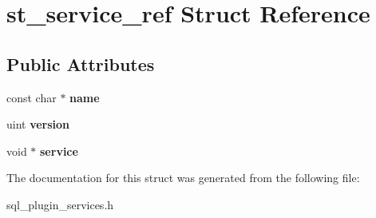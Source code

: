 \hypertarget{structst__service__ref}{}\section{st\+\_\+service\+\_\+ref Struct Reference}
\label{structst__service__ref}
\subsection*{Public Attributes}
\begin{DoxyCompactItemize}
\item 
\mbox{\label{structst__service__ref_a521925632625de51bb4b00590d41423d}} 
const char $\ast$ {\bfseries name}
\item 
\mbox{\label{structst__service__ref_a46d30d77ead3bc4d843fb9708e8fb305}} 
uint {\bfseries version}
\item 
\mbox{\label{structst__service__ref_a0ae1abac64595d817ac2bb397cc0181e}} 
void $\ast$ {\bfseries service}
\end{DoxyCompactItemize}


The documentation for this struct was generated from the following file\+:\begin{DoxyCompactItemize}
\item 
sql\+\_\+plugin\+\_\+services.\+h\end{DoxyCompactItemize}
